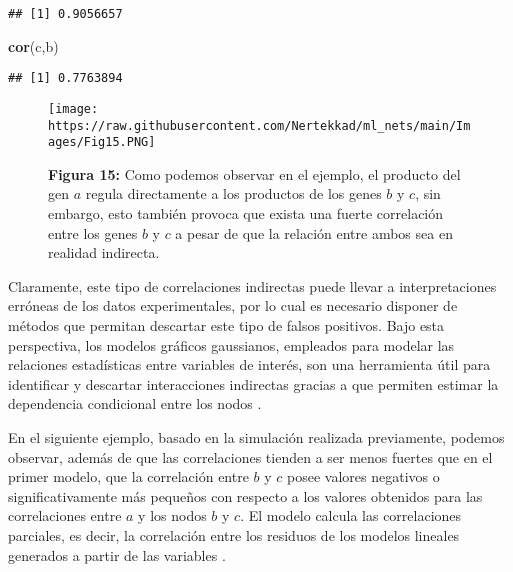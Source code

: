 \documentclass[
]{book}
\newenvironment{Shaded}{\begin{snugshade}}{\end{snugshade}}
\newcommand{\CommentTok}[1]{\textcolor[rgb]{0.56,0.35,0.01}{\textit{#1}}}
\newcommand{\KeywordTok}[1]{\textcolor[rgb]{0.13,0.29,0.53}{\textbf{#1}}}
\newcommand{\NormalTok}[1]{#1}
\newcommand{\OperatorTok}[1]{\textcolor[rgb]{0.81,0.36,0.00}{\textbf{#1}}}
\begin{document}
\begin{verbatim}
## [1] 0.9056657
\end{verbatim}

\begin{Shaded}
\begin{Highlighting}[]
\KeywordTok{cor}\NormalTok{(c,b)}
\end{Highlighting}
\end{Shaded}

\begin{verbatim}
## [1] 0.7763894
\end{verbatim}

\begin{figure}
\centering
\texttt{[image: https://raw.githubusercontent.com/Nertekkad/ml\_nets/main/Images/Fig15.PNG]}
\caption{\textbf{Figura 15:} Como podemos observar en el ejemplo, el producto del gen \(a\) regula directamente a los productos de los genes \(b\) y \(c\), sin embargo, esto también provoca que exista una fuerte correlación entre los genes \(b\) y \(c\) a pesar de que la relación entre ambos sea en realidad indirecta.}
\end{figure}

Claramente, este tipo de correlaciones indirectas puede llevar a interpretaciones erróneas de los datos experimentales, por lo cual es necesario disponer de métodos que permitan descartar este tipo de falsos positivos. Bajo esta perspectiva, los modelos gráficos gaussianos\citep{uhler2017gaussian}, empleados para modelar las relaciones estadísticas entre variables de interés, son una herramienta útil para identificar y descartar interacciones indirectas gracias a que permiten estimar la dependencia condicional entre los nodos \citep{villaintroduction}.

En el siguiente ejemplo, basado en la simulación realizada previamente, podemos observar, además de que las correlaciones tienden a ser menos fuertes que en el primer modelo, que la correlación entre \(b\) y \(c\) posee valores negativos o significativamente más pequeños con respecto a los valores obtenidos para las correlaciones entre \(a\) y los nodos \(b\) y \(c\). El modelo calcula las correlaciones parciales, es decir, la correlación entre los residuos de los modelos lineales generados a partir de las variables \citep{villaintroduction}.

\begin{Shaded}
\end{Shaded}
\end{document}
